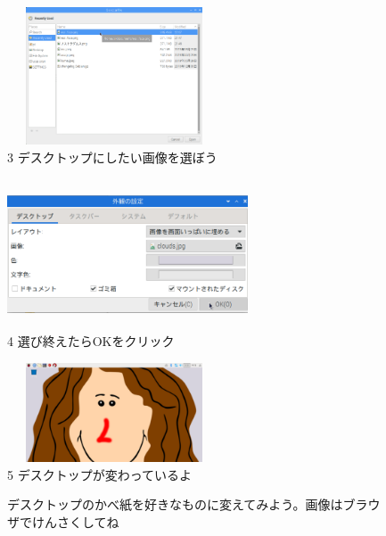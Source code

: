\documentclass[a4paper,12pt]{jarticle}
\begin{document}
\begin{figure}
\begin{minipage}{\textwidth}
    \begin{minipage}{6.376cm}
      \includegraphics[width=6.347cm,height=4.084cm]{textbook-img110.png}\\
      3 デスクトップにしたい画像を選ぼう
    \end{minipage}
    \begin{minipage}{2.582cm}
    \end{minipage}
    \begin{minipage}{5.737cm}
      \includegraphics[width=7.145cm,height=4.451cm]{textbook-img109.png}\\
      4 選び終えたらOKをクリック
    \end{minipage}

  \end{minipage}

  \bigskip


  \flushleft
  \begin{minipage}{6.134cm}
    \includegraphics[width=6.347cm,height=2.945cm]{textbook-img111.png}\\
    5 デスクトップが変わっているよ
  \end{minipage}

  \bigskip

  \theQuestion\label{Q:hasAnswer02-7}

  デスクトップのかべ紙を好きなものに変えてみよう。画像はブラウザでけんさくしてね
\end{figure}
\end{document}
